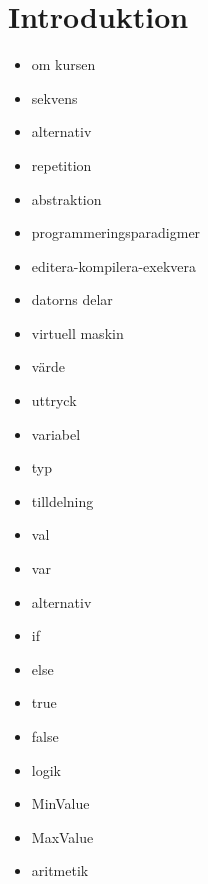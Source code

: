 \chapter{Introduktion}
\begin{itemize}[nosep]
\item om kursen
\item sekvens
\item alternativ
\item repetition
\item abstraktion
\item programmeringsparadigmer
\item editera-kompilera-exekvera
\item datorns delar
\item virtuell maskin
\item värde
\item uttryck
\item variabel
\item typ
\item tilldelning
\item val
\item var
\item alternativ
\item if
\item else
\item true
\item false
\item logik
\item MinValue
\item MaxValue
\item aritmetik\end{itemize}